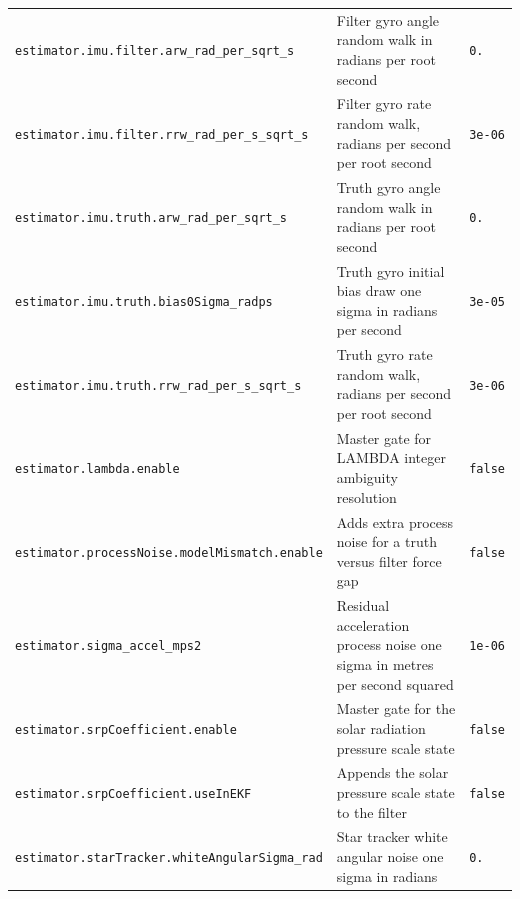 \begin{center}
\begin{longtable}{>{\raggedright\arraybackslash\scriptsize\ttfamily}p{}|>{\raggedright\arraybackslash}p{}|>{\raggedright\arraybackslash\scriptsize\ttfamily}p{}}
\texttt{estimator.\allowbreak imu.\allowbreak filter.\allowbreak arw\_\allowbreak rad\_\allowbreak per\_\allowbreak sqrt\_\allowbreak s} & Filter gyro angle random walk in radians per root second & \texttt{0.\allowbreak 0002} \\
\texttt{estimator.\allowbreak imu.\allowbreak filter.\allowbreak rrw\_\allowbreak rad\_\allowbreak per\_\allowbreak s\_\allowbreak sqrt\_\allowbreak s} & Filter gyro rate random walk, radians per second per root second & \texttt{3e-06} \\
\texttt{estimator.\allowbreak imu.\allowbreak truth.\allowbreak arw\_\allowbreak rad\_\allowbreak per\_\allowbreak sqrt\_\allowbreak s} & Truth gyro angle random walk in radians per root second & \texttt{0.\allowbreak 0002} \\
\texttt{estimator.\allowbreak imu.\allowbreak truth.\allowbreak bias0\allowbreak Sigma\_\allowbreak radps} & Truth gyro initial bias draw one sigma in radians per second & \texttt{3e-05} \\
\texttt{estimator.\allowbreak imu.\allowbreak truth.\allowbreak rrw\_\allowbreak rad\_\allowbreak per\_\allowbreak s\_\allowbreak sqrt\_\allowbreak s} & Truth gyro rate random walk, radians per second per root second & \texttt{3e-06} \\
\texttt{estimator.\allowbreak lambda.\allowbreak enable} & Master gate for LAMBDA integer ambiguity resolution & \texttt{false} \\
\texttt{estimator.\allowbreak process\allowbreak Noise.\allowbreak model\allowbreak Mismatch.\allowbreak enable} & Adds extra process noise for a truth versus filter force gap & \texttt{false} \\
\texttt{estimator.\allowbreak sigma\_\allowbreak accel\_\allowbreak mps2} & Residual acceleration process noise one sigma in metres per second squared & \texttt{1e-06} \\
\texttt{estimator.\allowbreak srp\allowbreak Coefficient.\allowbreak enable} & Master gate for the solar radiation pressure scale state & \texttt{false} \\
\texttt{estimator.\allowbreak srp\allowbreak Coefficient.\allowbreak use\allowbreak In\allowbreak EKF} & Appends the solar pressure scale state to the filter & \texttt{false} \\
\texttt{estimator.\allowbreak star\allowbreak Tracker.\allowbreak white\allowbreak Angular\allowbreak Sigma\_\allowbreak rad} & Star tracker white angular noise one sigma in radians & \texttt{0.\allowbreak 0001\allowbreak 4544\allowbreak 4104\allowbreak 3328608} \\

\end{longtable}
\end{center}
